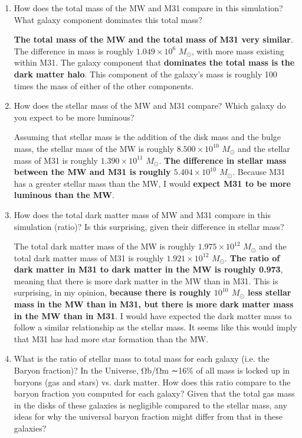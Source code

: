 \documentclass[12pt]{article}
\begin{document}
\begin{enumerate}

\item How does the total mass of the MW and M31 compare in this simulation? What galaxy component dominates this total mass?  

\noindent \textbf{The total mass of the MW and the total mass of M31 very similar}. The difference in mass is roughly $1.049\times 10^{6}$ $M_{\odot}$, with more mass existing within M31. The galaxy component that \textbf{dominates the total mass is the dark matter halo}. This component of the galaxy's mass is roughly 100 times the mass of either of the other components.

\item How does the stellar mass of the MW and M31 compare? Which galaxy do you expect to be more luminous?

\noindent Assuming that stellar mass is the addition of the disk mass and the bulge mass, the stellar mass of the MW is roughly $8.500\times 10^{10}$ $M_{\odot}$ and the stellar mass of M31 is roughly $1.390\times 10^{11}$ $M_{\odot}$. \textbf{The difference in stellar mass between the MW and M31 is roughly $5.404\times 10^{10}$ $M_{\odot}$}. Because M31 has a greater stellar mass than the MW, I would \textbf{expect M31 to be more luminous than the MW}.

\item How does the total dark matter mass of MW and M31 compare in this simulation (ratio)? Is this surprising, given their difference in stellar mass?

\noindent The total dark matter mass of the MW is roughly $1.975\times 10^{12}$ $M_{\odot}$ and the total dark matter mass of M31 is roughly $1.921\times 10^{12}$ $M_{\odot}$. \textbf{The ratio of dark matter in M31 to dark matter in the MW is roughly 0.973}, meaning that there is more dark matter in the MW than in M31. This is surprising, in my opinion, \textbf{because there is roughly $10^{10}$ $M_{\odot}$ less stellar mass in the MW than in M31, but there is more dark matter mass in the MW than in M31}. I would have expected the dark matter mass to follow a similar relationship as the stellar mass. It seems like this would imply that M31 has had more star formation than the MW.

\item What is the ratio of stellar mass to total mass for each galaxy (i.e. the Baryon fraction)? In the Universe, Ωb/Ωm ∼16\% of all mass is locked up in baryons (gas and stars) vs. dark matter. How does this ratio compare to the baryon fraction you computed for each galaxy? Given that the total gas mass in the disks of these galaxies is negligible compared to the stellar mass, any ideas for why the universal baryon fraction might differ from that in these galaxies?


\end{enumerate}
\end{document}
